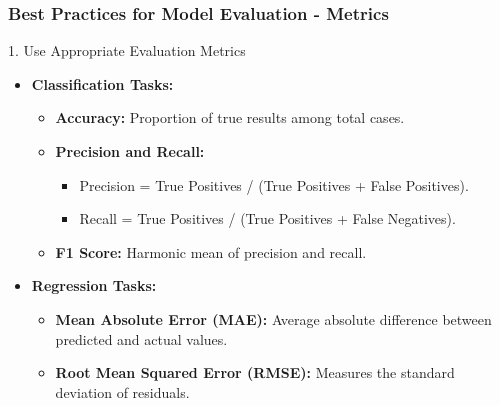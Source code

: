 \documentclass[aspectratio=169]{beamer}
\begin{document}
\begin{frame}[fragile]
    \frametitle{Best Practices for Model Evaluation - Metrics}
    \begin{block}{1. Use Appropriate Evaluation Metrics}
        \begin{itemize}
            \item \textbf{Classification Tasks:}
                \begin{itemize}
                    \item \textbf{Accuracy:} Proportion of true results among total cases.
                    \item \textbf{Precision and Recall:}
                        \begin{itemize}
                            \item Precision = True Positives / (True Positives + False Positives).
                            \item Recall = True Positives / (True Positives + False Negatives).
                        \end{itemize}
                    \item \textbf{F1 Score:} Harmonic mean of precision and recall.
                \end{itemize}
            \item \textbf{Regression Tasks:}
                \begin{itemize}
                    \item \textbf{Mean Absolute Error (MAE):} Average absolute difference between predicted and actual values.
                    \item \textbf{Root Mean Squared Error (RMSE):} Measures the standard deviation of residuals.
                \end{itemize}
        \end{itemize}
    \end{block}
\end{frame}
\end{document}
